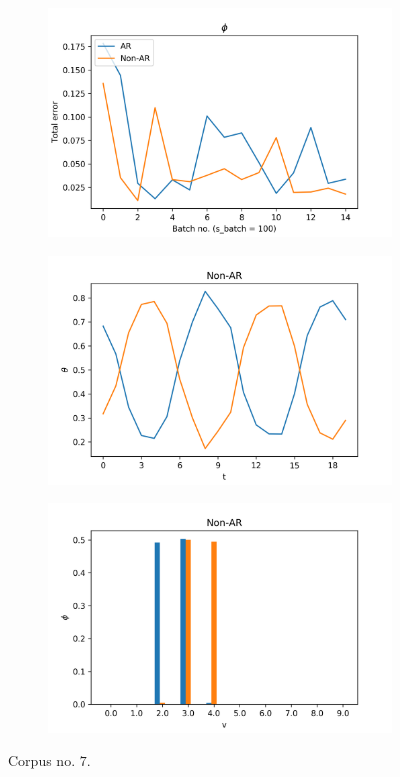 \documentclass[12pt]{article}
\begin{document}
\begin{figure}[H]
  \begin{subfigure}[b]{0.3\textwidth}
    \includegraphics[width=\linewidth]{performance_phis_experiment-1|overlapping-yes_dataset-7.png}
  \end{subfigure}%
  \begin{subfigure}[b]{0.3\textwidth}
    \includegraphics[width=\linewidth]{latent_thetas_Non-AR_experiment-1|overlapping-yes_dataset-7.png}
  \end{subfigure}%
  \begin{subfigure}[b]{0.3\textwidth}
    \includegraphics[width=\linewidth]{latent_phis_Non-AR_experiment-1|overlapping-yes_dataset-7.png}
  \end{subfigure}%
  \caption{Corpus no. $7$.}


\end{figure}
\end{document}
